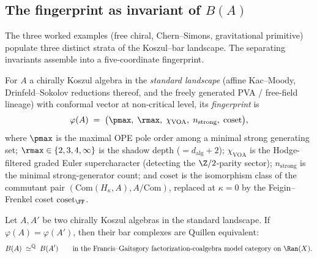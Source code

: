 \subsection{The fingerprint as invariant of $B(A)$}
\label{subsec:fingerprint-classification}

The three worked examples (free chiral, Chern--Simons, gravitational primitive) populate three distinct strata of the Koszul--bar landscape. The separating invariants assemble into a five-coordinate fingerprint.

\begin{definition}
\label{def:fingerprint}
For $A$ a chirally Koszul algebra in the \emph{standard landscape}
(affine Kac--Moody, Drinfeld--Sokolov reductions thereof, and the
freely generated PVA / free-field lineage) with conformal vector at
non-critical level, its \emph{fingerprint} is
\[
 \varphi(A) \;=\; \bigl(\pmax,\; \rmax,\; \chi_{\mathrm{VOA}},\; n_{\mathrm{strong}},\; \mathrm{coset}\bigr),
\]
where $\pmax$ is the maximal OPE pole order among a minimal strong
generating set; $\rmax \in \{2,3,4,\infty\}$ is the shadow depth
($= d_{\mathrm{alg}} + 2$); $\chi_{\mathrm{VOA}}$ is the Hodge-filtered
graded Euler supercharacter (detecting the $\Z/2$-parity sector);
$n_{\mathrm{strong}}$ is the minimal strong-generator count;
and $\mathrm{coset}$ is the isomorphism class
of the commutant pair $(\mathrm{Com}(H_\kappa, A), A/\mathrm{Com})$,
replaced at $\kappa = 0$ by the Feigin--Frenkel coset $\mathrm{coset}_{\FF}$.
\end{definition}

\begin{theorem}
\label{thm:fingerprint-completeness-standard}
Let $A, A'$ be two chirally Koszul algebras in the standard landscape.
If $\varphi(A) = \varphi(A')$, then their bar complexes are Quillen
equivalent:
\[
 B(A) \;\simeq^{\mathrm{Q}}\; B(A')
 \qquad\text{in the Francis--Gaitsgory factorization-coalgebra model category on $\Ran(X)$.}
\]
\end{theorem}

